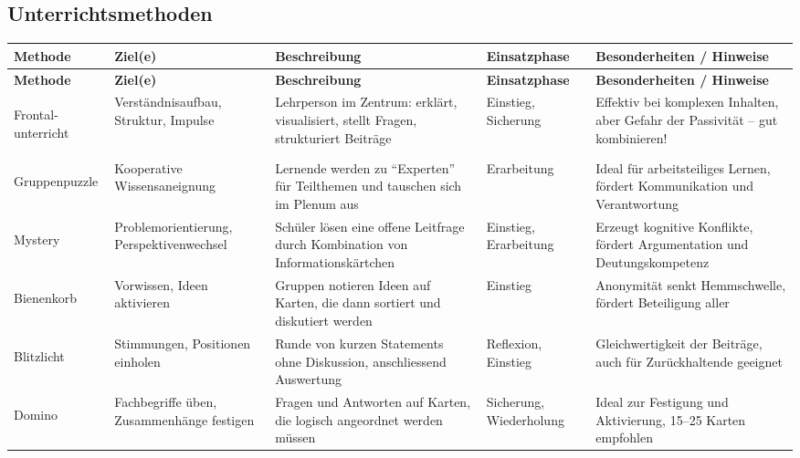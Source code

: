 \begin{landscape}

\section*{Unterrichtsmethoden}

\begin{longtable}{>{\bfseries}p{3cm} p{3cm} p{6.5cm} p{3cm} p{6.5cm}}
\textbf{Methode} & \textbf{Ziel(e)} & \textbf{Beschreibung} & \textbf{Einsatzphase} & \textbf{Besonderheiten / Hinweise} \\
\midrule
\endfirsthead
\textbf{Methode} & \textbf{Ziel(e)} & \textbf{Beschreibung} & \textbf{Einsatzphase} & \textbf{Besonderheiten / Hinweise} \\
\midrule\midrule
\endhead

Frontal-\newline unterricht &
Verständnisaufbau, Struktur, Impulse &
Lehrperson im Zentrum: erklärt, visualisiert, stellt Fragen, strukturiert Beiträge &
Einstieg, Sicherung &
Effektiv bei komplexen Inhalten, aber Gefahr der Passivität -- gut kombinieren! \\
\midrule

Gruppenpuzzle &
Kooperative Wissensaneignung &
Lernende werden zu \enquote{Experten} für Teilthemen und tauschen sich im Plenum aus &
Erarbeitung &
Ideal für arbeitsteiliges Lernen, fördert Kommunikation und Verantwortung \\
\midrule

Mystery &
Problemorientierung, Perspektivenwechsel &
Schüler lösen eine offene Leitfrage durch Kombination von Informationskärtchen &
Einstieg, Erarbeitung &
Erzeugt kognitive Konflikte, fördert Argumentation und Deutungskompetenz \\
\midrule

Bienenkorb &
Vorwissen, Ideen aktivieren &
Gruppen notieren Ideen auf Karten, die dann sortiert und diskutiert werden &
Einstieg &
Anonymität senkt Hemmschwelle, fördert Beteiligung aller \\
\midrule

Blitzlicht &
Stimmungen, Positionen einholen &
Runde von kurzen Statements ohne Diskussion, anschliessend Auswertung &
Reflexion, Einstieg &
Gleichwertigkeit der Beiträge, auch für Zurückhaltende geeignet \\
\midrule

Domino &
Fachbegriffe üben, Zusammenhänge festigen &
Fragen und Antworten auf Karten, die logisch angeordnet werden müssen &
Sicherung, Wiederholung &
Ideal zur Festigung und Aktivierung, 15--25 Karten empfohlen \\
\midrule


\end{longtable}
\end{landscape}
